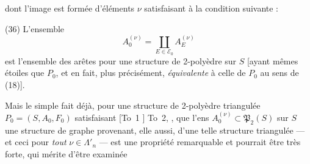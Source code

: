 \documentclass[11pt,a4paper]{article}
\begin{document}
dont l'image est formée d'éléments $\nu$ satisfaisant
à la condition suivante :

(36) L'ensemble 
\[
A_0^{(\nu)}=\coprod_{E\in\mathcal{E}_0}A_E^{(\nu)}
\]
\quad est l'ensemble des arêtes pour une
\quad structure de 2-polyèdre sur $S$ [ayant
\quad mêmes étoiles que $P_0$, et en fait, plus précisément,
\quad \emph{équivalente} à celle de $P_0$ au sens de (18)].

Mais le simple fait déjà,  pour une
structure de 2-polyèdre triangulée $P_0=(S,A_0,F_0)$
satisfaisant [To~1 ] To~2, , que l'ens $A_0^{(\nu)}\subset\mathfrak{P}_2(S)$
 sur $S$ une structure de graphe
provenant, elle aussi, d'une telle structure
triangulée — et ceci pour \emph{tout} $\nu\in\Lambda'_n$ —
\struck{\ill{}} est une propriété remarquable
et pourrait être très forte, qui mérite d'être examinée
\end{document}
